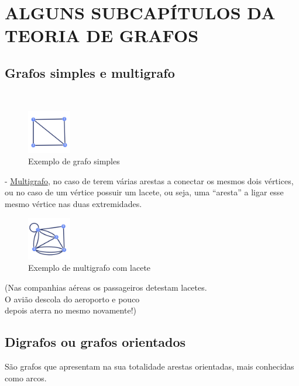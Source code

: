 \section{ALGUNS SUBCAPÍTULOS DA TEORIA DE GRAFOS}
\subsection{Grafos simples e multigrafo}
\\
\begin{figure}[h]
    \centering
    \includegraphics[width=0.17\textwidth]{imgs/Figura3}
    \caption{Exemplo de grafo simples\label{fig:imagem3}}
\end{figure}
\linebreak
- \underline{Multigrafo}, no caso de terem várias arestas a conectar os mesmos dois vértices, ou no caso de um vértice possuir um lacete, ou seja, uma “aresta” a ligar esse mesmo vértice nas duas extremidades.\\
\begin{figure}[h]
    \centering
    \includegraphics[width=0.17\textwidth]{imgs/Figura4}
    \caption{Exemplo de multigrafo com lacete\label{fig:imagem4}}
\end{figure}
\linebreak
\begin{flushright}{\scriptsize{(Nas companhias aéreas os passageiros detestam lacetes.\\O avião descola do aeroporto e pouco\\depois aterra no mesmo novamente!)}}\end{flushright}

\subsection{Digrafos ou grafos orientados}
São grafos que apresentam na sua totalidade arestas orientadas, mais conhecidas como arcos.\\


